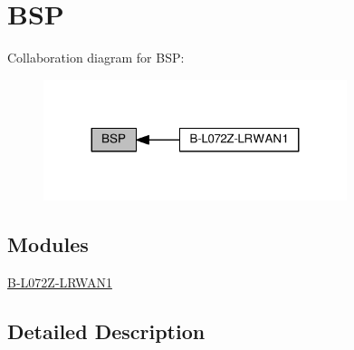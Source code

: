 \hypertarget{group__BSP}{}\section{B\+SP}
\label{group__BSP}
Collaboration diagram for B\+SP\+:
\nopagebreak
\begin{figure}[H]
\begin{center}
\leavevmode
\includegraphics[width=251pt]{group__BSP}
\end{center}
\end{figure}
\subsection*{Modules}
\begin{DoxyCompactItemize}
\item 
\hyperlink{group__B-L072Z-LRWAN1}{B-\/\+L072\+Z-\/\+L\+R\+W\+A\+N1}
\end{DoxyCompactItemize}


\subsection{Detailed Description}
